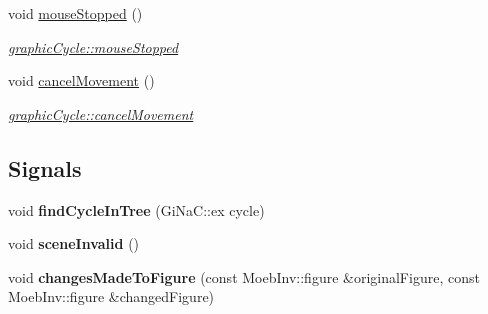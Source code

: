 \begin{DoxyCompactItemize}
void \mbox{\hyperlink{classgraphic_cycle_a173e5e3dfb0dde41c8046a53086e02ab}{mouse\+Stopped}} ()
\begin{DoxyCompactList}\small\item\em \mbox{\hyperlink{classgraphic_cycle_a173e5e3dfb0dde41c8046a53086e02ab}{graphic\+Cycle\+::mouse\+Stopped}} \end{DoxyCompactList}\item 
void \mbox{\hyperlink{classgraphic_cycle_af79bfc4ed813bab595a2a721475a7199}{cancel\+Movement}} ()
\begin{DoxyCompactList}\small\item\em \mbox{\hyperlink{classgraphic_cycle_af79bfc4ed813bab595a2a721475a7199}{graphic\+Cycle\+::cancel\+Movement}} \end{DoxyCompactList}\end{DoxyCompactItemize}
\subsection*{Signals}
\begin{DoxyCompactItemize}
\item 
\mbox{\label{classgraphic_cycle_ae60f6c55734308b7811d0f5ff9116227}} 
void {\bfseries find\+Cycle\+In\+Tree} (Gi\+Na\+C\+::ex cycle)
\item 
\mbox{\label{classgraphic_cycle_aa36164d21bdd1b7cde5b26407f330d49}} 
void {\bfseries scene\+Invalid} ()
\item 
\mbox{\label{classgraphic_cycle_a04f2deb84f4a748e8bb9dba7a43eb653}} 
void {\bfseries changes\+Made\+To\+Figure} (const Moeb\+Inv\+::figure \&original\+Figure, const Moeb\+Inv\+::figure \&changed\+Figure)
\end{DoxyCompactItemize}
